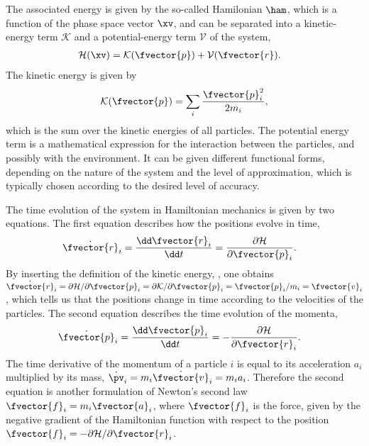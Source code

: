 The associated energy is given by the so-called Hamilonian $\ham$, which is a function
of the phase space vector $\xv$, and can be separated into a kinetic-energy term $\mathcal{K}$
and a potential-energy term $\mathcal{V}$ of the system,
%
\begin{align}
 \mathcal{H}(\xv) &= \mathcal{K}(\fvector{p}) + \mathcal{V}(\fvector{r}). \label{eq:ham}
\end{align}
%
The kinetic energy is given by
%
\begin{align}
   \mathcal{K}(\fvector{p}) = \sum_i \frac{\fvector{p}_i^2}{2 m_i}, \label{eq:kinetic}
\end{align}
%
which is the sum over the kinetic energies of all particles.
%
The potential energy term is a mathematical expression for the
interaction between the particles, and possibly with the environment.
It can 
be given
different functional forms, depending on the nature of the
system and the level of approximation,
which is typically chosen according to the desired level of accuracy.


The time evolution of the system in Hamiltonian mechanics is given by two equations.
The first equation describes how the positions evolve in time,
\begin{align}
 \dot{\fvector{r}}_i &= \frac{\dd \fvector{r}_i}{\dd t} =   \frac{\partial \mathcal{H}}{\partial \fvector{p}_i}. \label{eq:ri}
 \end{align}
 By inserting the definition of the kinetic energy, , one obtains
 $ \dot{\fvector{r}}_i = \partial \mathcal{H} / \partial \fvector{p}_i
    = \partial \mathcal{K} / \partial \fvector{p}_i
    = \fvector{p}_i / m_i = \fvector{v}_i$,
 which tells us that the positions change in time according
 to the velocities of the particles. The second equation describes the
 time evolution of the momenta, 
%
\begin{align}  
 \dot{\fvector{p}}_i &= \frac{\dd \fvector{p}_i}{\dd t} = - \frac{\partial \mathcal{H}}{\partial \fvector{r}_i} \label{eq:pi} . 
\end{align}
%
The time derivative of the momentum of a particle $i$ is equal to its acceleration $a_i$
multiplied by its mass, $\dot{\pv}_i=m_i\dot{\fvector{v}}_i=m_ia_i$.
Therefore the second equation is another formulation of
Newton's 
second law $\fvector{f}_i = m_i \fvector{a}_i$,
where $\fvector{f}_i$ is the force, given by the negative
gradient of the Hamiltonian function with respect to the
position $\fvector{f}_i=-\partial \mathcal{H}/\partial \fvector{r}_i$.

